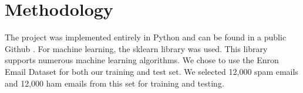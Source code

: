 \section{Methodology}
The project was implemented entirely in Python and can be found in a public Github \cite{projectCode}. For machine learning, the sklearn library \cite{sklearn} was used. This library supports numerous machine learning algorithms. We chose to use the Enron Email Dataset \cite{enron} for both our training and test set. We selected 12,000 spam emails and 12,000 ham emails from this set for training and testing. 

